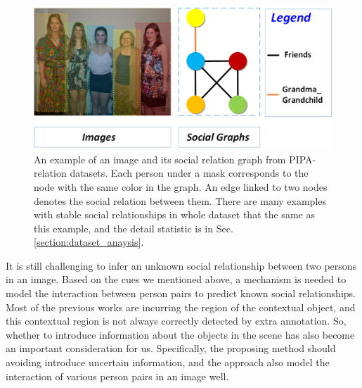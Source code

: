 \documentclass{article}
\begin{document}
\vspace*{-1mm}
\begin{figure}[htpb]
	\centering
	\includegraphics[width=0.48 \textwidth,clip]{./pic/example_1.png}
 \caption{An example of an image and its social relation graph from PIPA-relation datasets.
Each person under a mask corresponds to the node with the same color in the graph. An edge linked to two nodes denotes the social relation between them.
There are many examples with stable social relationships in whole dataset that the same as this example, and the detail statistic is in Sec. \ref{section:dataset_anaysis}.}
	\vspace*{-3.5mm}
	\label{fig:example}
\end{figure}



It is still challenging to infer an unknown social relationship between two persons in an image.
Based on the cues we mentioned above, a mechanism is needed to model the interaction between person pairs to predict known social relationships. Most of the previous works are incurring the region of the contextual object, and this contextual region is not always correctly detected by extra annotation. So, whether to introduce information about the objects in the scene has also become an important consideration for us. Specifically, the proposing method should avoiding introduce uncertain information, and the approach also model the interaction of various person pairs in an image well.
\end{document}
